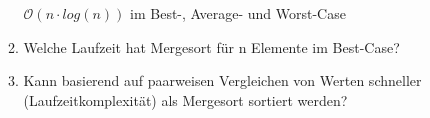 \documentclass{lehramt-informatik}
\begin{document}
\begin{enumerate}
\begin{enumerate}
\begin{antwort}
$\mathcal{O}(n \cdot log(n))$ im Best-, Average- und Worst-Case
\end{antwort}

\item Welche Laufzeit hat Mergesort für n Elemente im Best-Case?

\item Kann basierend auf paarweisen Vergleichen von Werten schneller
(Laufzeitkomplexität) als Mergesort sortiert werden?
\end{enumerate}
\end{enumerate}

\literatur
\end{document}
